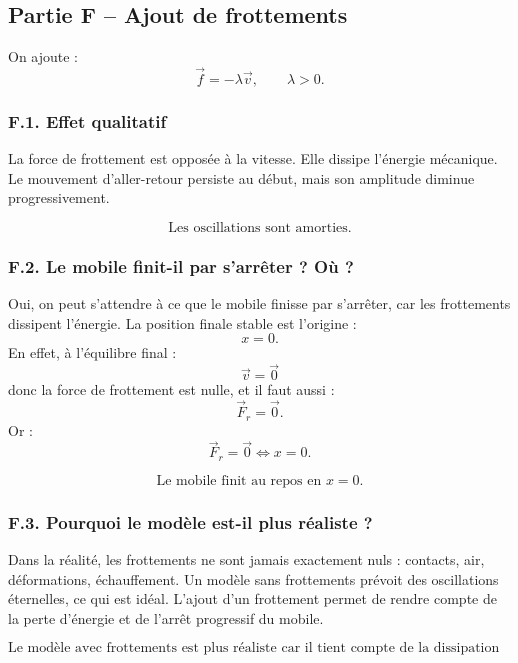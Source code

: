 \documentclass[11pt,a4paper]{article}
\begin{document}
\subsection{Partie F -- Ajout de frottements}

On ajoute :
\[
\vec f=-\lambda \vec v,
\qquad \lambda>0.
\]

\subsubsection*{F.1. Effet qualitatif}

La force de frottement est opposée à la vitesse. Elle dissipe l'énergie mécanique.
Le mouvement d'aller-retour persiste au début, mais son amplitude diminue progressivement.

\begin{resultatbox}
\[
\boxed{\text{Les oscillations sont amorties.}}
\]
\end{resultatbox}

\subsubsection*{F.2. Le mobile finit-il par s'arrêter ? Où ?}

Oui, on peut s'attendre à ce que le mobile finisse par s'arrêter, car les frottements dissipent l'énergie.
La position finale stable est l'origine :
\[
x=0.
\]
En effet, à l'équilibre final :
\[
\vec v=\vec 0
\]
donc la force de frottement est nulle, et il faut aussi :
\[
\vec F_r=\vec 0.
\]
Or :
\[
\vec F_r=\vec 0 \Longleftrightarrow x=0.
\]

\begin{resultatbox}
\[
\boxed{\text{Le mobile finit au repos en }x=0.}
\]
\end{resultatbox}

\subsubsection*{F.3. Pourquoi le modèle est-il plus réaliste ?}

Dans la réalité, les frottements ne sont jamais exactement nuls : contacts, air, déformations, échauffement.
Un modèle sans frottements prévoit des oscillations éternelles, ce qui est idéal.
L'ajout d'un frottement permet de rendre compte de la perte d'énergie et de l'arrêt progressif du mobile.

\begin{resultatbox}
\[
\boxed{\text{Le modèle avec frottements est plus réaliste car il tient compte de la dissipation d'énergie.}}
\]
\end{resultatbox}
\end{document}
